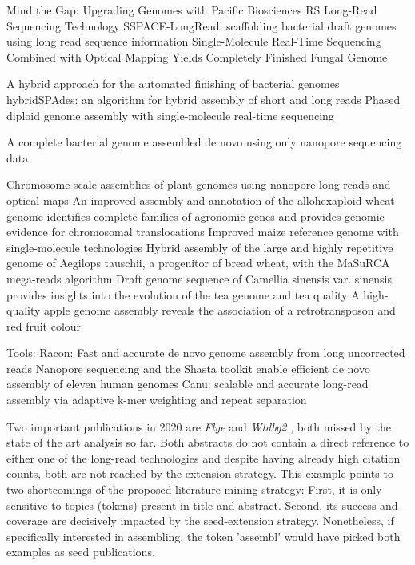 Mind the Gap: Upgrading Genomes with Pacific Biosciences RS Long-Read Sequencing Technology \cite{English2012}
SSPACE-LongRead: scaffolding bacterial draft genomes using long read sequence information \cite{Boetzer2014}
Single-Molecule Real-Time Sequencing Combined with Optical Mapping Yields Completely Finished Fungal Genome \cite{Faino2015}

A hybrid approach for the automated finishing of bacterial genomes \cite{Bashir2012}
hybridSPAdes: an algorithm for hybrid assembly of short and long reads \cite{Antipov2016}
Phased diploid genome assembly with single-molecule real-time sequencing \cite{Chin2016}

A complete bacterial genome assembled de novo using only nanopore sequencing data \cite{Loman2015}

Chromosome-scale assemblies of plant genomes using nanopore long reads and optical maps \cite{Belser2018}
An improved assembly and annotation of the allohexaploid wheat genome identifies complete families of agronomic genes and provides genomic evidence for chromosomal translocations \cite{Clavijo2017}
Improved maize reference genome with single-molecule technologies \cite{Jiao2017}
Hybrid assembly of the large and highly repetitive genome of Aegilops tauschii, a progenitor of bread wheat, with the MaSuRCA mega-reads algorithm \cite{Zimin2017}
Draft genome sequence of Camellia sinensis var. sinensis provides insights into the evolution of the tea genome and tea quality \cite{Wei2018}
A high-quality apple genome assembly reveals the association of a retrotransposon and red fruit colour \cite{Zhang2019}


Tools:
Racon: Fast and accurate de novo genome assembly from long uncorrected reads \cite{Vaser2017}
Nanopore sequencing and the Shasta toolkit enable efficient de novo assembly of eleven human genomes \cite{Shafin2020}
Canu: scalable and accurate long-read assembly via adaptive k-mer weighting and repeat separation \cite{Koren2017}


Two important publications in 2020 are \textit{Flye} \cite{Kolmogorov2019} and \textit{Wtdbg2} \cite{Ruan2020}, both missed by the state of the art analysis so far.
Both abstracts do not contain a direct reference to either one of the long-read technologies and despite having already high citation counts, both are not reached by the extension strategy.
This example points to two shortcomings of the proposed literature mining strategy: First, it is only sensitive to topics (tokens) present in title and abstract.
Second, its success and coverage are decisively impacted by the seed-extension strategy.
Nonetheless, if specifically interested in assembling, the token 'assembl' would have picked both examples as seed publications.



